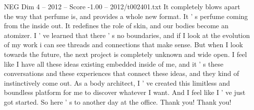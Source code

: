 \begin{textsample}{NEG Dim 4 – 2012 – Score -1.00 – 2012/t002401.txt}
It completely blows apart the way that perfume is, and provides a whole new format.
It ' s perfume coming from the inside out.
It redefines the role of skin, and our bodies become an atomizer.
I ' ve learned that there ' s no boundaries, and if I look at the evolution of my work i can see threads and connections that make sense.
But when I look towards the future, the next project is completely unknown and wide open.
I feel like I have all these ideas existing embedded inside of me, and it ' s these conversations and these experiences that connect these ideas, and they kind of instinctively come out.
As a body architect, I ' ve created this limitless and boundless platform for me to discover whatever I want.
And I feel like I ' ve just got started.
So here ' s to another day at the office.
Thank you!
Thank you!

\end{textsample}
